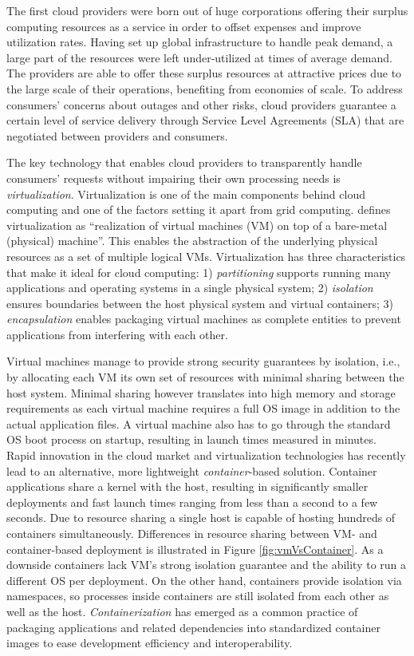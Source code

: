 The first cloud providers were born out of huge corporations offering their surplus computing resources as a service in order to offset expenses and improve utilization rates. Having set up global infrastructure to handle peak demand, a large part of the resources were left under-utilized at times of average demand. The providers are able to offer these surplus resources at attractive prices due to the large scale of their operations, benefiting from economies of scale. To address consumers' concerns about outages and other risks, cloud providers guarantee a certain level of service delivery through Service Level Agreements (SLA) that are negotiated between providers and consumers. \parencite{youseff08cloudOntology}

The key technology that enables cloud providers to transparently handle consumers' requests without impairing their own processing needs is \textit{virtualization}. Virtualization is one of the main components behind cloud computing and one of the factors setting it apart from grid computing. \textcite{tsuruoka16} defines virtualization as ``realization of virtual machines (VM) on top of a bare-metal (physical) machine''. This enables the abstraction of the underlying physical resources as a set of multiple logical VMs. Virtualization has three characteristics that make it ideal for cloud computing: 1) \textit{partitioning} supports running many applications and operating systems in a single physical system; 2) \textit{isolation} ensures boundaries between the host physical system and virtual containers; 3) \textit{encapsulation} enables packaging virtual machines as complete entities to prevent applications from interfering with each other.

Virtual machines manage to provide strong security guarantees by isolation, i.e., by allocating each VM its own set of resources with minimal sharing between the host system. Minimal sharing however translates into high memory and storage requirements as each virtual machine requires a full OS image in addition to the actual application files. A virtual machine also has to go through the standard OS boot process on startup, resulting in launch times measured in minutes. Rapid innovation in the cloud market and virtualization technologies has recently lead to an alternative, more lightweight \textit{container}-based solution. Container applications share a kernel with the host, resulting in significantly smaller deployments and fast launch times ranging from less than a second to a few seconds. Due to resource sharing a single host is capable of hosting hundreds of containers simultaneously. Differences in resource sharing between VM- and container-based deployment is illustrated in Figure \ref{fig:vmVsContainer}. As a downside containers lack VM's strong isolation guarantee and the ability to run a different OS per deployment. On the other hand, containers provide isolation via namespaces, so processes inside containers are still isolated from each other as well as the host. \textit{Containerization} has emerged as a common practice of packaging applications and related dependencies into standardized container images to ease development efficiency and interoperability. \parencite{pahl15containerization}

